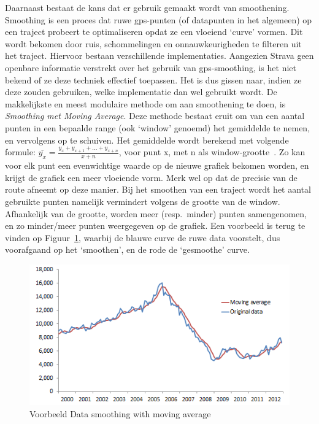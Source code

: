 Daarnaast bestaat de kans dat er gebruik gemaakt wordt van smoothening.
Smoothing is een proces dat ruwe \ac{gps}-punten (of datapunten in het
algemeen) op een traject probeert te optimaliseren opdat ze een vloeiend
`curve' vormen. Dit wordt bekomen door ruis, schommelingen en onnauwkeurigheden
te filteren uit het traject. Hiervoor bestaan verschillende implementaties.
Aangezien Strava geen openbare informatie verstrekt over het gebruik van
gps-smoothing, is het niet bekend of ze deze techniek effectief toepassen. Het
is dus gissen naar, indien ze deze zouden gebruiken, welke implementatie dan
wel gebruikt wordt. De makkelijkste en meest modulaire methode om aan
smoothening te doen, is \textit{Smoothing met Moving Average}. Deze methode
bestaat eruit om van een aantal punten in een bepaalde range (ook `window'
genoemd) het gemiddelde te nemen, en vervolgens op te schuiven. Het gemiddelde
wordt berekend met volgende formule: $\overline{y_x} = \frac{y_x + y_{x+1} +
        \ldots + y_{x+n}}{x+n}$, voor punt x, met n als
window-grootte~\cite{Smoothin16:online,
    SmoothingandInterpolatingNoisyGPSDatawithSmoothingSplines, Smoothin86:online}.
Zo kan voor elk punt een evenwichtige waarde op de nieuwe grafiek bekomen
worden, en krijgt de grafiek een meer vloeiende vorm. Merk wel op dat de
precisie van de route afneemt op deze manier. Bij het smoothen van een traject
wordt het aantal gebruikte punten namelijk vermindert volgens de grootte van de
window. Afhankelijk van de grootte, worden meer (resp.\ minder) punten
samengenomen, en zo minder/meer punten weergegeven op de grafiek. Een voorbeeld
is terug te vinden op Figuur~\ref{fig:SmoothingExample}, waarbij de blauwe
curve de ruwe data voorstelt, dus voorafgaand op het `smoothen', en de rode de
`gesmoothe' curve.
\begin{figure}[h]
    \centering
    \includegraphics[width=0.6\linewidth]{fig/SmoothingExample.png}
    \caption{Voorbeeld Data smoothing with moving average}\label{fig:SmoothingExample}
\end{figure}

